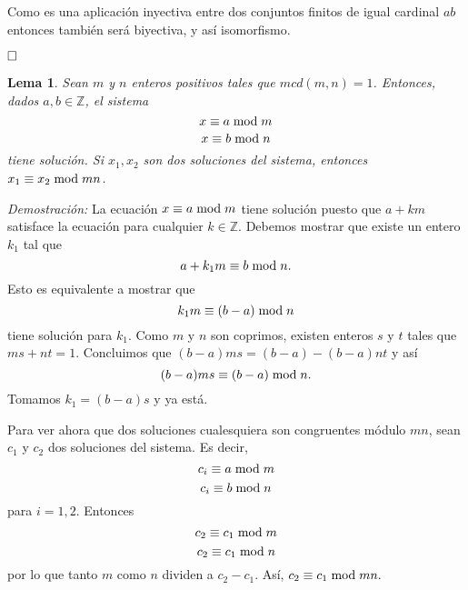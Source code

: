 \documentclass[12pt]{article}
\newtheorem{lemma}{Lema}[theorem]
\begin{document}
Como es una aplicación inyectiva entre dos conjuntos finitos de igual cardinal $ab$ entonces también será biyectiva, y así isomorfismo.

$\hfill \square$

\begin{lemma}Sean $m$ y $n$ enteros positivos tales que $mcd(m,n)=1$. Entonces, dados $a,b \in \mathbb{Z}$, el sistema $$x \equiv a \hspace{0.1cm} \text{mod} \hspace{0.1cm} m$$
$$x \equiv b \hspace{0.1cm} \text{mod} \hspace{0.1cm} n$$ tiene solución. Si $x_1, x_2$ son dos soluciones del sistema, entonces $x_1 \equiv x_2 \hspace{0.1cm} \text{mod} \hspace{0.1cm} mn$.
\end{lemma}
\emph{Demostración: }La ecuación $x \equiv a \hspace{0.1cm} \text{mod} \hspace{0.1cm} m$ tiene solución puesto que $a+km$ satisface la ecuación para cualquier $k \in \mathbb{Z}$. Debemos mostrar que existe un entero $k_1$ tal que $$a+k_1m \equiv b \hspace{0.1cm} \text{mod} \hspace{0.1cm} n.$$ Esto es equivalente a mostrar que $$k_1m \equiv (b-a) \hspace{0.1cm} \text{mod} \hspace{0.1cm} n$$ tiene solución para $k_1$. Como $m$ y $n$ son coprimos, existen enteros $s$ y $t$ tales que $ms+nt=1$. Concluimos que $(b-a)ms=(b-a)-(b-a)nt$ y así $$(b-a)ms \equiv (b-a) \hspace{0.1cm} \text{mod} \hspace{0.1cm} n.$$
Tomamos $k_1=(b-a)s$ y ya está.

Para ver ahora que dos soluciones cualesquiera son congruentes módulo $mn$, sean $c_1$ y $c_2$ dos soluciones del sistema. Es decir, 
$$c_i\equiv a \hspace{0.1cm} \text{mod} \hspace{0.1cm} m$$
$$c_i \equiv b \hspace{0.1cm} \text{mod} \hspace{0.1cm} n$$ para $i=1,2$. Entonces $$c_2 \equiv c_1 \hspace{0.1cm} \text{mod} \hspace{0.1cm} m$$ $$c_2 \equiv c_1 \hspace{0.1cm} \text{mod} \hspace{0.1cm} n$$ por lo que tanto $m$ como $n$ dividen a $c_2-c_1$. Así, $c_2 \equiv c_1 \hspace{0.1cm} \text{mod} \hspace{0.1cm} mn.$
\end{document}
